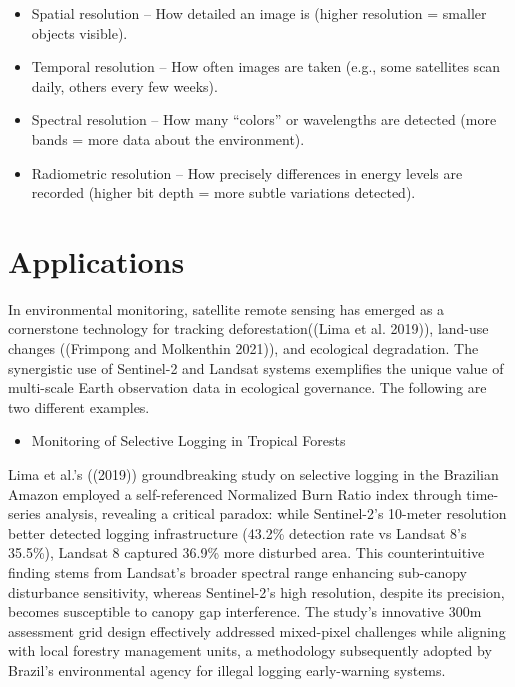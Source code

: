 \documentclass[
  letterpaper,
]{scrbook}
\providecommand{\tightlist}{%
  \setlength{\itemsep}{0pt}\setlength{\parskip}{0pt}}\usepackage{longtable,booktabs,array}
\begin{document}
\begin{itemize}
\item
  Spatial resolution -- How detailed an image is (higher resolution =
  smaller objects visible).
\item
  Temporal resolution -- How often images are taken (e.g., some
  satellites scan daily, others every few weeks).
\item
  Spectral resolution -- How many ``colors'' or wavelengths are detected
  (more bands = more data about the environment).
\item
  Radiometric resolution -- How precisely differences in energy levels
  are recorded (higher bit depth = more subtle variations detected).
\end{itemize}

\section{Applications}\label{applications}

In environmental monitoring, satellite remote sensing has emerged as a
cornerstone technology for tracking deforestation((Lima et al. 2019)),
land-use changes ((Frimpong and Molkenthin 2021)), and ecological
degradation. The synergistic use of Sentinel-2 and Landsat systems
exemplifies the unique value of multi-scale Earth observation data in
ecological governance. The following are two different examples.

\begin{itemize}
\tightlist
\item
  Monitoring of Selective Logging in Tropical Forests
\end{itemize}

Lima et al.'s ((2019)) groundbreaking study on selective logging in the
Brazilian Amazon employed a self-referenced Normalized Burn Ratio index
through time-series analysis, revealing a critical paradox: while
Sentinel-2's 10-meter resolution better detected logging infrastructure
(43.2\% detection rate vs Landsat 8's 35.5\%), Landsat 8 captured 36.9\%
more disturbed area. This counterintuitive finding stems from Landsat's
broader spectral range enhancing sub-canopy disturbance sensitivity,
whereas Sentinel-2's high resolution, despite its precision, becomes
susceptible to canopy gap interference. The study's innovative 300m
assessment grid design effectively addressed mixed-pixel challenges
while aligning with local forestry management units, a methodology
subsequently adopted by Brazil's environmental agency for illegal
logging early-warning systems.
\end{document}
